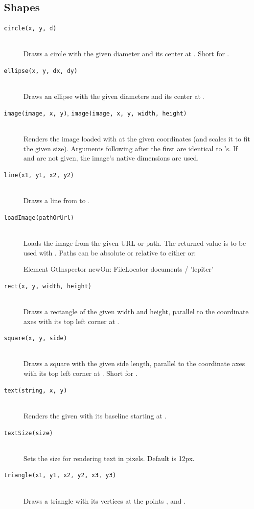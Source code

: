 \subsection{Shapes}
\begin{description}
\item[\texttt{circle(x, y, d)}] \hfill \\
	Draws a circle with the given diameter and its center at . Short for .
\item[\texttt{ellipse(x, y, dx, dy)}] \hfill \\
	Draws an ellipse with the given diameters and its center at .
\item[\texttt{image(image, x, y)}, \texttt{image(image, x, y, width, height)}] \hfill \\
	Renders the image loaded with  at the given coordinates (and scales it to fit the given size). Arguments following after the first are identical to 's. If  and  are not given, the image's native dimensions are used.
\item[\texttt{line(x1, y1, x2, y2)}] \hfill \\
	Draws a line from  to .
\item[\texttt{loadImage(pathOrUrl)}] \hfill \\
	Loads the image from the given URL or path. The returned value is to be used with .
Paths can be absolute or relative to either  or:
\begin{code}
Element
GtInspector newOn: FileLocator documents / 'lepiter'
\end{code}
\item[\texttt{rect(x, y, width, height)}] \hfill \\
	Draws a rectangle of the given width and height, parallel to the coordinate axes with its top left corner at .
\item[\texttt{square(x, y, side)}] \hfill \\
	Draws a square with the given side length, parallel to the coordinate axes with its top left corner at . Short for .
\item[\texttt{text(string, x, y)}] \hfill \\
	Renders the given  with its baseline starting at .
\item[\texttt{textSize(size)}] \hfill \\
	Sets the size for rendering text in pixels. Default is 12px.
\item[\texttt{triangle(x1, y1, x2, y2, x3, y3)}] \hfill \\
	Draws a triangle with its vertices at the points ,  and .
\end{description}

